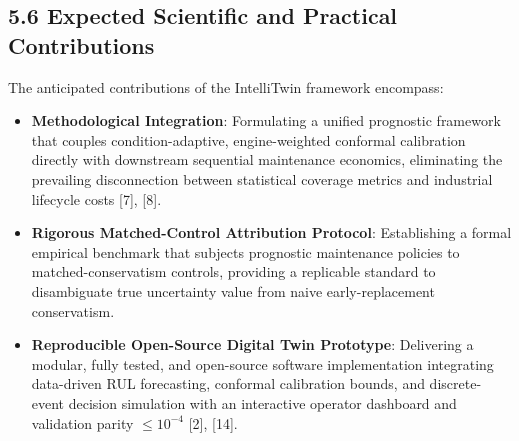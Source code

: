 \documentclass[12pt,a4paper]{article}
\begin{document}
\subsection*{5.6 Expected Scientific and Practical Contributions}
The anticipated contributions of the IntelliTwin framework encompass:
\begin{itemize}
    \item \textbf{Methodological Integration}: Formulating a unified prognostic framework that couples condition-adaptive, engine-weighted conformal calibration directly with downstream sequential maintenance economics, eliminating the prevailing disconnection between statistical coverage metrics and industrial lifecycle costs [7], [8].
    \item \textbf{Rigorous Matched-Control Attribution Protocol}: Establishing a formal empirical benchmark that subjects prognostic maintenance policies to matched-conservatism controls, providing a replicable standard to disambiguate true uncertainty value from naive early-replacement conservatism.
    \item \textbf{Reproducible Open-Source Digital Twin Prototype}: Delivering a modular, fully tested, and open-source software implementation integrating data-driven RUL forecasting, conformal calibration bounds, and discrete-event decision simulation with an interactive operator dashboard and validation parity $\le 10^{-4}$ [2], [14].
\end{itemize}
\end{document}
